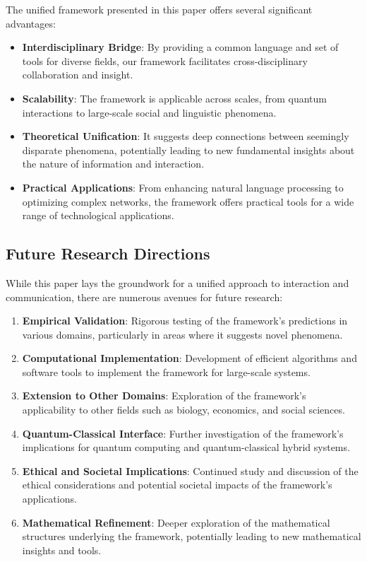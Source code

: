 The unified framework presented in this paper offers several significant advantages:

\begin{itemize}
    \item \textbf{Interdisciplinary Bridge}: By providing a common language and set of tools for diverse fields, our framework facilitates cross-disciplinary collaboration and insight.
    \item \textbf{Scalability}: The framework is applicable across scales, from quantum interactions to large-scale social and linguistic phenomena.
    \item \textbf{Theoretical Unification}: It suggests deep connections between seemingly disparate phenomena, potentially leading to new fundamental insights about the nature of information and interaction.
    \item \textbf{Practical Applications}: From enhancing natural language processing to optimizing complex networks, the framework offers practical tools for a wide range of technological applications.
\end{itemize}

\subsection{Future Research Directions}

While this paper lays the groundwork for a unified approach to interaction and communication, there are numerous avenues for future research:

\begin{enumerate}
    \item \textbf{Empirical Validation}: Rigorous testing of the framework's predictions in various domains, particularly in areas where it suggests novel phenomena.
    \item \textbf{Computational Implementation}: Development of efficient algorithms and software tools to implement the framework for large-scale systems.
    \item \textbf{Extension to Other Domains}: Exploration of the framework's applicability to other fields such as biology, economics, and social sciences.
    \item \textbf{Quantum-Classical Interface}: Further investigation of the framework's implications for quantum computing and quantum-classical hybrid systems.
    \item \textbf{Ethical and Societal Implications}: Continued study and discussion of the ethical considerations and potential societal impacts of the framework's applications.
    \item \textbf{Mathematical Refinement}: Deeper exploration of the mathematical structures underlying the framework, potentially leading to new mathematical insights and tools.
\end{enumerate}

